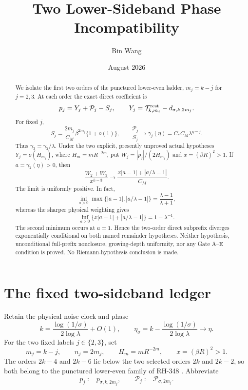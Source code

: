\documentclass[11pt]{article}
\title{Two Lower-Sideband Phase Incompatibility}
\author{Bin Wang}
\date{August 2026}
\theoremstyle{remark}
\newcommand{\cP}{\mathcal P}
\newcommand{\cT}{\mathcal T}
\begin{document}
\maketitle

\begin{abstract}
We isolate the first two orders of the punctured lower-even ladder,
$m_j=k-j$ for $j=2,3$.  At each order the exact direct coefficient is
\[
 p_j=Y_j+\cP_j-S_j,
 \qquad
 Y_j=\cT_{k,m_j}^{\rm rest}-d_{\sigma,k,2m_j}.
\]
For fixed $j$,
\[
 S_j=\frac{2m_j}{C_M}\beta^{2m_j}\{1+o(1)\},\qquad
 \frac{\cP_j}{S_j}\longrightarrow
 \gamma_j(\eta)=C_*C_M\lambda^{\eta-j}.
\]
Thus $\gamma_3=\gamma_2/\lambda$.  Under the two explicit, presently
unproved actual hypotheses $Y_j=o(H_{m_j})$, where
$H_m=mR^{-2m}$, put $W_j=|p_j|/(2H_{m_j})$ and
$x=(\beta R)^2>1$.  If $a=\gamma_2(\eta)>0$, then
\[
 \frac{W_2+W_3}{x^{k-3}}
 \longrightarrow
 \frac{x|a-1|+|a/\lambda-1|}{C_M}.
\]
The limit is uniformly positive.  In fact,
\[
 \inf_{a>0}\max\{|a-1|,|a/\lambda-1|\}
 =\frac{\lambda-1}{\lambda+1},
\]
whereas the sharper physical weighting gives
\[
 \inf_{a>0}\{x|a-1|+|a/\lambda-1|\}=1-\lambda^{-1}.
\]
The second minimum occurs at $a=1$.  Hence the two-order direct subprefix
diverges exponentially conditional on both named remainder hypotheses.
Neither hypothesis, unconditional full-prefix nonclosure, growing-depth
uniformity, nor
any Gate A--E condition is proved.  No Riemann-hypothesis conclusion is
made.
\end{abstract}

\section{The fixed two-sideband ledger}

Retain the physical noise clock and phase
\begin{equation}\label{eq:clock}
 k=\frac{\log(1/\sigma)}{2\log\lambda}+O(1),\qquad
 \eta_\sigma=k-\frac{\log(1/\sigma)}{2\log\lambda}
 \longrightarrow\eta.
\end{equation}
For the two fixed labels $j\in\{2,3\}$, set
\begin{equation}\label{eq:indices}
 m_j=k-j,\qquad n_j=2m_j,\qquad
 H_m=mR^{-2m},\qquad x=(\beta R)^2>1.
\end{equation}
The orders $2k-4$ and $2k-6$ lie below the two selected orders $2k$ and
$2k-2$, so both belong to the punctured lower-even family of RH-348
\citep{WangLowerLadder2026}.
Abbreviate
\begin{equation}\label{eq:shorthand}
 p_j:=p_{\sigma,k,2m_j},\qquad
 \cP_j:=\cP_{\sigma,2m_j}.
\end{equation}
\end{document}
